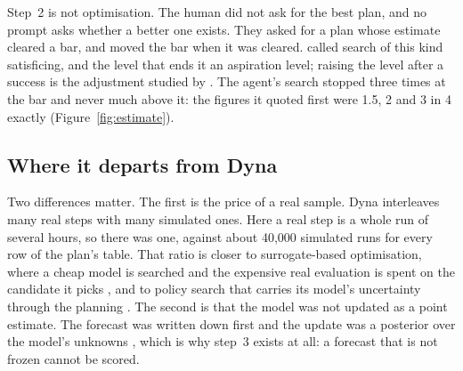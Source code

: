 \documentclass[11pt,a4paper]{article}
\begin{document}
\begin{center}
\end{center}

Step~2 is not optimisation. The human did not ask for the best plan, and no prompt asks whether a better one exists. They asked for a plan whose estimate cleared a bar, and moved the bar when it was cleared. \citet{simon1956} called search of this kind satisficing, and the level that ends it an aspiration level; raising the level after a success is the adjustment studied by \citet{selten1998}. The agent's search stopped three times at the bar and never much above it: the figures it quoted first were 1.5, 2 and 3 in 4 exactly (Figure~\ref{fig:estimate}).

\subsection{Where it departs from Dyna}

Two differences matter. The first is the price of a real sample. Dyna interleaves many real steps with many simulated ones. Here a real step is a whole run of several hours, so there was one, against about 40,000 simulated runs for every row of the plan's table. That ratio is closer to surrogate-based optimisation, where a cheap model is searched and the expensive real evaluation is spent on the candidate it picks \citep{jones1998ego}, and to policy search that carries its model's uncertainty through the planning \citep{deisenroth2011pilco}. The second is that the model was not updated as a point estimate. The forecast was written down first and the update was a posterior over the model's unknowns \citep{gelman2013bda}, which is why step~3 exists at all: a forecast that is not frozen cannot be scored.
\end{document}
